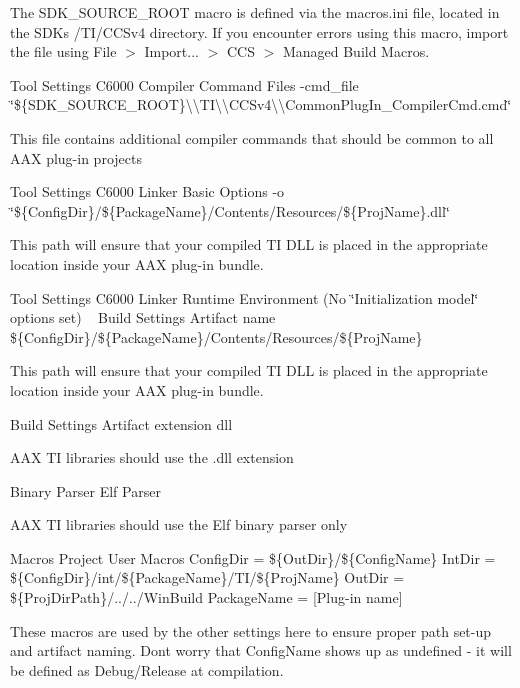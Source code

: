 The {\ttfamily S\+D\+K\+\_\+\+S\+O\+U\+R\+C\+E\+\_\+\+R\+O\+OT} macro is defined via the macros.\+ini file, located in the S\+DK\textquotesingle{}s /\+T\+I/\+C\+C\+Sv4 directory. If you encounter errors using this macro, import the file using File $>$ Import... $>$ C\+CS $>$ Managed Build Macros.

 Tool Settings   C6000 Compiler   Command Files   {\ttfamily -\/cmd\+\_\+file \char`\"{}\$\{\+S\+D\+K\+\_\+\+S\+O\+U\+R\+C\+E\+\_\+\+R\+O\+O\+T\}\textbackslash{}\textbackslash{}\+T\+I\textbackslash{}\textbackslash{}\+C\+C\+Sv4\textbackslash{}\textbackslash{}\+Common\+Plug\+In\+\_\+\+Compiler\+Cmd.\+cmd\char`\"{}}

This file contains additional compiler commands that should be common to all A\+AX plug-\/in projects

 Tool Settings   C6000 Linker   Basic Options   {\ttfamily -\/o \char`\"{}\$\{\+Config\+Dir\}/\$\{\+Package\+Name\}/\+Contents/\+Resources/\$\{\+Proj\+Name\}.\+dll\char`\"{}}

This path will ensure that your compiled TI D\+LL is placed in the appropriate location inside your A\+AX plug-\/in bundle.

 Tool Settings   C6000 Linker   Runtime Environment   (No \char`\"{}\+Initialization model\char`\"{} options set) ~\newline
  Build Settings   Artifact name   {\ttfamily \$\{Config\+Dir\}/\$\{Package\+Name\}/\+Contents/\+Resources/\$\{Proj\+Name\}}

This path will ensure that your compiled TI D\+LL is placed in the appropriate location inside your A\+AX plug-\/in bundle.

 Build Settings   Artifact extension   {\ttfamily dll}

A\+AX TI libraries should use the .dll extension

 Binary Parser   Elf Parser

A\+AX TI libraries should use the Elf binary parser only

 Macros   Project   User Macros   Config\+Dir = {\ttfamily \$\{Out\+Dir\}/\$\{Config\+Name\}}  Int\+Dir = {\ttfamily \$\{Config\+Dir\}/int/\$\{Package\+Name\}/\+T\+I/\$\{Proj\+Name\}}  Out\+Dir = {\ttfamily \$\{Proj\+Dir\+Path\}/../../\+Win\+Build}  Package\+Name = \mbox{[}Plug-\/in name\mbox{]}

These macros are used by the other settings here to ensure proper path set-\/up and artifact naming. Don\textquotesingle{}t worry that {\ttfamily Config\+Name} shows up as undefined -\/ it will be defined as Debug/\+Release at compilation.

